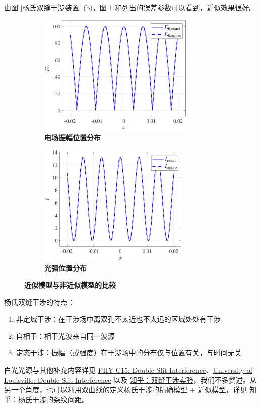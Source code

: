 \documentclass[UTF8]{report}
\theoremstyle{MyLineTheoremStyle} %
\theoremstyle{MyBlockTheoremStyle} %
\theoremstyle{MySubsubsectionStyle} %
\begin{document}
由图 \ref{杨氏双缝干涉装置} (b)，图 \ref{近似模型与非近似模型的比较} 和列出的误差参数可以看到，近似效果很好。

\begin{figure}[H]\centering
\begin{subfigure}[t]{0.5\columnwidth}\centering
    \includegraphics[height=165pt]{assets/3/杨电场.pdf}
    \caption{\bfseries 电场振幅位置分布 }
\end{subfigure}\hfill
\begin{subfigure}[t]{0.5\columnwidth}\centering
    \includegraphics[height=165pt]{assets/3/杨光强.pdf}
    \caption{\bfseries 光强位置分布 }
\end{subfigure}
\caption{\bfseries 近似模型与非近似模型的比较 }\label{近似模型与非近似模型的比较}
\end{figure}

\noindent 杨氏双缝干涉的特点：
\begin{enumerate}
\item 非定域干涉：在干涉场中离双孔不太近也不太远的区域处处有干涉
\item 自相干：相干光波来自同一波源
\item 定态干涉：振幅（或强度）在干涉场中的分布仅与位置有关，与时间无关
\end{enumerate}


白光光源与其他补充内容详见 \href{https://produckthieves.home.blog/2020/02/10/phy-c15-double-slit-interference/}{PHY C15: Double Slit Interference}、\href{https://www.physics.louisville.edu/cldavis/phys299/notes/lo_interference.html}{University of Louisville: Double Slit Interference} 以及 \href{https://zhuanlan.zhihu.com/p/335815195}{知乎：双缝干涉实验}，我们不多赘述。从另一个角度，也可以利用双曲线的定义杨氏干涉的精确模型 + 近似模型，详见 \href{https://www.zhihu.com/question/382600481/answer/2565939868}{知乎：杨氏干涉的条纹间距}。
\end{document}
